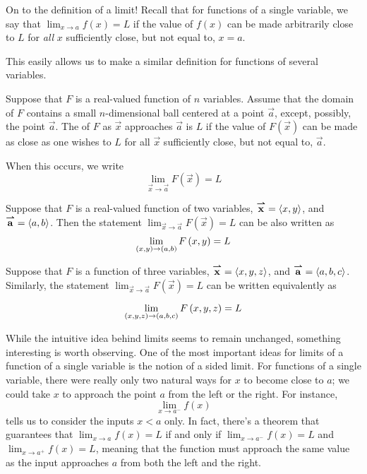 \documentclass{ximera}
\begin{document}
On to the definition of a limit!
Recall that for functions of a single variable, we say that $\lim_{x\to a} f(x) = L$ if the value of $f(x)$ can be made arbitrarily close to $L$ for \emph{all} $x$ sufficiently close, but not equal to, $x=a$.

This easily allows us to make a similar definition for functions of several variables.

\begin{definition}
 Suppose that $F$ is a real-valued function of $n$ variables. Assume that the domain of $F$ contains a small $n$-dimensional ball centered at a point $\vec{a}$, except, possibly, the point $\vec{a}$.
  The  of $F$ as $\vec{x}$ approaches $\vec{a}$ is $L$ if the value of $F(\vec{x})$ can be made as close as one wishes to $L$ for all $\vec{x}$ sufficiently close, but not equal to, $\vec{a}$.

 When this occurs, we write
 \[
 \lim_{\vec{x}\to \vec{a}} F(\vec{x}) = L
 \]
\end{definition}

 \begin{remark}
  Suppose that $F$ is a real-valued function of two variables, ${\overset{\boldsymbol{\rightharpoonup}}{\mathbf{x}}}\hspace{0in} = \left\langle x,y\right\rangle$, and ${\overset{\boldsymbol{\rightharpoonup}}{\mathbf{a}}}\hspace{0in} =
  \left\langle a,b\right\rangle$.
  Then the statement $ \lim_{\vec{x}\to \vec{a}} F(\vec{x}) = L$ can be also written as
    \[
    \lim_{\left(x,y\right)\to \left(a,b\right) }F\left(x,y\right) = L
    \]
\end{remark}
  \begin{remark}
    Suppose that $F$ is a function of three variables, ${\overset{\boldsymbol{\rightharpoonup}}{\mathbf{x}}}\hspace{0in} = \left\langle x,y,z\right\rangle$, and
    ${\overset{\boldsymbol{\rightharpoonup}}{\mathbf{a}}}\hspace{0in} = \left\langle a,b,c\right\rangle$. Similarly, the statement
    $ \lim_{\vec{x}\to \vec{a}} F(\vec{x}) = L$ can be written equivalently as

      \[
      \lim_{\left(x,y,z\right)\to \left(a,b,c\right)} F\left(x,y,z\right) = L
      \]


\end{remark}

While the intuitive idea behind limits seems to remain unchanged, something interesting is worth observing.  One of the most important ideas for limits of a function of a single variable is the notion of a sided limit.  For functions of a single variable, there were really only two natural ways for $x$ to become close to $a$; we could take $x$ to approach the point $a$ from the left or the right.  For instance,
\[
\lim_{x\to a^-}f(x)
\]
tells us to consider the inputs $x<a$ only.  In fact, there's a theorem that guarantees that $\lim_{x\to a} f(x) = L$ if and only if $\lim_{x\to a^-}f(x) =L$ and $\lim_{x\to a^+}f(x) =L$, meaning that the function must approach the same value as the input approaches $a$ from both the left and the right.
\end{document}
